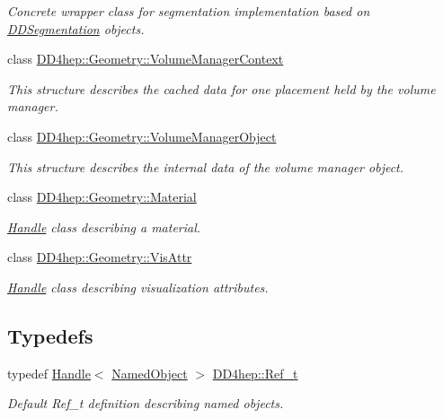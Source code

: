 \begin{DoxyCompactItemize}
\begin{DoxyCompactList}\small\item\em Concrete wrapper class for segmentation implementation based on \hyperlink{namespace_d_d4hep_1_1_d_d_segmentation}{D\+D\+Segmentation} objects. \end{DoxyCompactList}\item 
class \hyperlink{class_d_d4hep_1_1_geometry_1_1_volume_manager_context}{D\+D4hep\+::\+Geometry\+::\+Volume\+Manager\+Context}
\begin{DoxyCompactList}\small\item\em This structure describes the cached data for one placement held by the volume manager. \end{DoxyCompactList}\item 
class \hyperlink{class_d_d4hep_1_1_geometry_1_1_volume_manager_object}{D\+D4hep\+::\+Geometry\+::\+Volume\+Manager\+Object}
\begin{DoxyCompactList}\small\item\em This structure describes the internal data of the volume manager object. \end{DoxyCompactList}\item 
class \hyperlink{class_d_d4hep_1_1_geometry_1_1_material}{D\+D4hep\+::\+Geometry\+::\+Material}
\begin{DoxyCompactList}\small\item\em \hyperlink{class_d_d4hep_1_1_handle}{Handle} class describing a material. \end{DoxyCompactList}\item 
class \hyperlink{class_d_d4hep_1_1_geometry_1_1_vis_attr}{D\+D4hep\+::\+Geometry\+::\+Vis\+Attr}
\begin{DoxyCompactList}\small\item\em \hyperlink{class_d_d4hep_1_1_handle}{Handle} class describing visualization attributes. \end{DoxyCompactList}\end{DoxyCompactItemize}
\subsection*{Typedefs}
\begin{DoxyCompactItemize}
\item 
typedef \hyperlink{class_d_d4hep_1_1_handle}{Handle}$<$ \hyperlink{class_d_d4hep_1_1_named_object}{Named\+Object} $>$ \hyperlink{group___d_d4_h_e_p___g_e_o_m_e_t_r_y_ga40af83be6718bb8828a3d83dc7f8c930}{D\+D4hep\+::\+Ref\+\_\+t}
\begin{DoxyCompactList}\small\item\em Default Ref\+\_\+t definition describing named objects. \end{DoxyCompactList}\end{DoxyCompactItemize}

